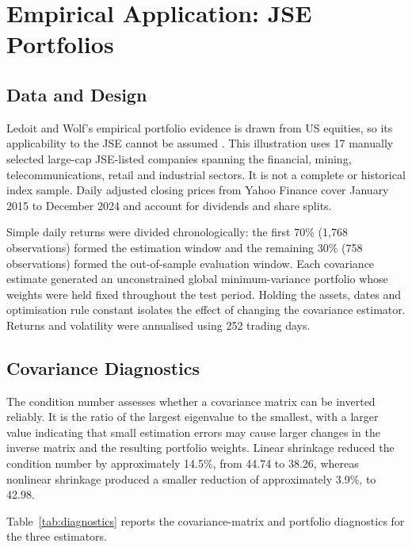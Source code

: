 \section{Empirical Application: JSE Portfolios}

\subsection{Data and Design}

Ledoit and Wolf's empirical portfolio evidence is drawn from US equities, so its applicability to the JSE cannot be assumed \parencite{LEDOIT2003603}. This illustration uses 17 manually selected large-cap JSE-listed companies spanning the financial, mining, telecommunications, retail and industrial sectors. It is not a complete or historical index sample. Daily adjusted closing prices from Yahoo Finance cover January 2015 to December 2024 and account for dividends and share splits.

Simple daily returns were divided chronologically: the first 70\% (1,768 observations) formed the estimation window and the remaining 30\% (758 observations) formed the out-of-sample evaluation window. Each covariance estimate generated an unconstrained global minimum-variance portfolio whose weights were held fixed throughout the test period. Holding the assets, dates and optimisation rule constant isolates the effect of changing the covariance estimator. Returns and volatility were annualised using 252 trading days.

\subsection{Covariance Diagnostics}

The condition number assesses whether a covariance matrix can be inverted reliably. It is the ratio of the largest eigenvalue to the smallest, with a larger value indicating that small estimation errors may cause larger changes in the inverse matrix and the resulting portfolio weights. Linear shrinkage reduced the condition number by approximately 14.5\%, from 44.74 to 38.26, whereas nonlinear shrinkage produced a smaller reduction of approximately 3.9\%, to 42.98.

Table~\ref{tab:diagnostics} reports the covariance-matrix and portfolio diagnostics for the three estimators.

